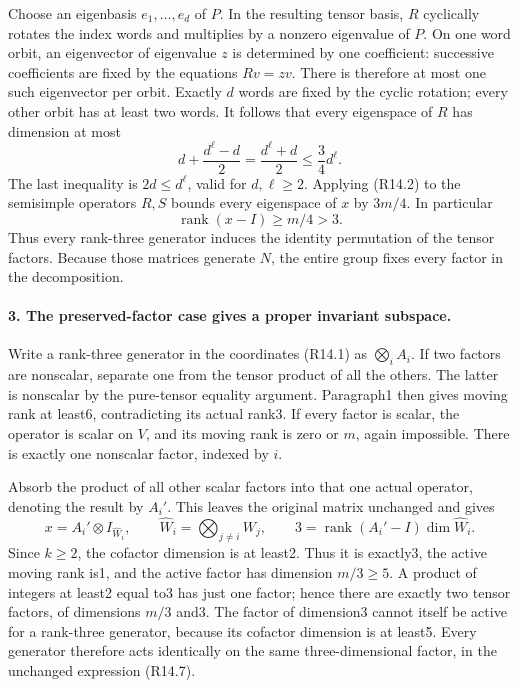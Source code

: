 Choose an eigenbasis \(e_1,\ldots,e_d\) of \(P\).
In the resulting tensor basis, \(R\) cyclically rotates
the index words and multiplies by a nonzero eigenvalue of
\(P\). On one word orbit, an eigenvector of eigenvalue
\(z\) is determined by one coefficient: successive
coefficients are fixed by the equations \(Rv=zv\).
There is therefore at most one such eigenvector per orbit.
Exactly \(d\) words are fixed by the cyclic rotation;
every other orbit has at least two words. It follows that
every eigenspace of \(R\) has dimension at most
\[
       d+\frac{d^\ell-d}{2}
       =\frac{d^\ell+d}{2}
       \le\frac34d^\ell.                                 \tag{R14.5}
\]
The last inequality is \(2d\le d^\ell\), valid for
\(d,\ell\ge2\). Applying (R14.2) to the semisimple
operators \(R,S\) bounds every eigenspace of \(x\) by
\(3m/4\). In particular
\[
                   \operatorname{rank}(x-I)\ge m/4>3.
                                                               \tag{R14.6}
\]
Thus every rank-three generator induces the identity
permutation of the tensor factors. Because those matrices
generate \(N\), the entire group fixes every factor in
the decomposition.

\paragraph{3. The preserved-factor case gives a proper invariant subspace.}
Write a rank-three generator in the coordinates (R14.1) as
\(\bigotimes_i A_i\). If two factors are nonscalar,
separate one from the tensor product of all the others.
The latter is nonscalar by the pure-tensor equality
argument. Paragraph1 then gives moving rank at least6,
contradicting its actual rank3. If every factor is scalar,
the operator is scalar on \(V\), and its moving rank is
zero or \(m\), again impossible. There is exactly one
nonscalar factor, indexed by \(i\).

Absorb the product of all other scalar factors into that
one actual operator, denoting the result by \(A_i'\).
This leaves the original matrix unchanged and gives
\[
 x=A_i'\otimes I_{\widehat W_i},\qquad
 \widehat W_i=\bigotimes_{j\ne i}W_j,\qquad
 3=\operatorname{rank}(A_i'-I)\dim\widehat W_i.           \tag{R14.7}
\]
Since \(k\ge2\), the cofactor dimension is at least2.
Thus it is exactly3, the active moving rank is1, and the
active factor has dimension \(m/3\ge5\). A product of
integers at least2 equal to3 has just one factor; hence
there are exactly two tensor factors, of dimensions
\(m/3\) and3. The factor of dimension3 cannot itself be
active for a rank-three generator, because its cofactor
dimension is at least5. Every generator therefore acts
identically on the same three-dimensional factor, in the
unchanged expression (R14.7).

